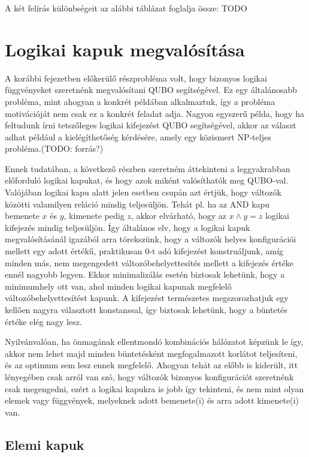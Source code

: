 A két felírás különbségeit az alábbi táblázat foglalja össze:
TODO


  

\section{Logikai kapuk megvalósítása}

A korábbi fejezetben előkerülő részprobléma volt, hogy bizonyos logikai függvényeket szeretnénk megvalósítani QUBO segítségével. Ez egy általánosabb probléma, mint ahogyan a konkrét példában alkalmaztuk, így a probléma motivációját nem csak ez a konkrét feladat adja. Nagyon egyszerű példa, hogy ha feltudunk írni tetszőleges logikai kifejezést QUBO segítségével, akkor az választ adhat például a kielégíthetőség kérdésére, amely egy közismert NP-teljes probléma.(TODO: forrás?)


Ennek tudatában, a következő részben szeretném áttekinteni a leggyakrabban előforduló logikai kapukat, és hogy azok miként valósíthatók meg QUBO-val. Valójában logikai kapu alatt jelen esetben csupán azt értjük, hogy változók közötti valamilyen reláció mindig teljesüljön. Tehát pl. ha az AND kapu bemenete $x$ és $y$, kimenete pedig $z$, akkor elvárható, hogy az $x \wedge y = z$ logikai kifejezés mindig teljesüljön. Így általános elv, hogy a logikai kapuk megvalósításánál igazából arra törekszünk, hogy a változók helyes konfigurációi mellett egy adott értékű, praktikusan 0-t adó kifejezést konstruáljunk, amíg minden más, nem megengedett változóbehelyettesítés mellett a kifejezés értéke ennél nagyobb legyen. Ekkor minimalizálás esetén biztosak lehetünk, hogy a minimumhely ott van, ahol minden logikai kapunak megfelelő változóbehelyettesítést kapunk. A kifejezést természetes megszorozhatjuk egy kellően nagyra választott konstanssal, így biztosak lehetünk, hogy a büntetés értéke elég nagy lesz.

Nyilvánvalóan, ha önmagának ellentmondó kombinációs hálózatot képzünk le így, akkor nem lehet majd minden büntetésként megfogalmazott korlátot teljesíteni, és az optimum sem lesz ennek megfelelő.
Ahogyan tehát az előbb is kiderült, itt lényegében csak arról van szó, hogy változók bizonyos konfigurációt szeretnénk csak megengedni, ezért a logikai kapukra is jobb így tekinteni, és nem mint olyan elemek vagy függvények, melyeknek adott bemenete(i) és arra adott kimenete(i) van.

\subsection{Elemi kapuk}

